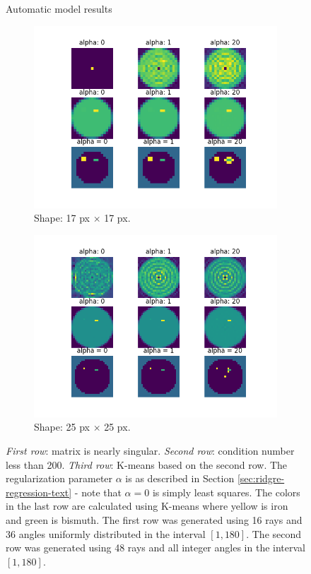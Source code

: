 \documentclass{article}
\begin{document}
\begin{figure}[H]
  \centering
  \large{Automatic model results} \\
  \begin{subfigure}[b]{0.45\linewidth}
    \includegraphics[width=\linewidth]{images/total-picture-17-condA1-3.1025624256157716e+16-condA2-7.2959506476769125.png}
    \caption{Shape: 17 px $\times$ 17 px.}
    \label{fig:sub1}
  \end{subfigure}
  \begin{subfigure}[b]{0.45\linewidth}
    \includegraphics[width=\linewidth]{images/total-picture-25-condA1-inf-condA2-49.46075340640841.png}
    \caption{Shape: 25 px $\times$ 25 px.}
    \label{fig:sub2}
  \end{subfigure}
  \caption{\small \emph{First row}: matrix is nearly singular. \emph{Second row}: condition number less than 200. \emph{Third row}: K-means based on the second row. The regularization parameter $\alpha$ is as described in Section \ref{sec:ridgre-regression-text} - note that $\alpha = 0$ is simply least squares. The colors in the last row are calculated using K-means where yellow is iron and green is bismuth. The first row was generated using 16 rays and 36 angles uniformly distributed in the interval $[1,180]$. The second row was generated using 48 rays and all integer angles in the interval $[1, 180]$. }
  \label{fig:two-different-images-for-4.1}
\end{figure}
\end{document}

